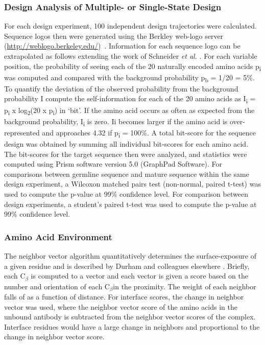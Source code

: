 \subsubsection{Design Analysis of Multiple- or Single-State Design}
For each design experiment, 100 independent design trajectories were calculated. Sequence logos then were generated using the Berkley web-logo server (\url{http://weblogo.berkeley.edu/})~\citep{Crooks:2004do}. Information for each sequence logo can be extrapolated as follows extending the work of Schneider \textit{et al.} \citep{Schneider:1990ub}. For each variable position, the probability of seeing each of the 20 naturally encoded amino acids p\textsubscript{i} was computed and compared with the background probability p\textsubscript{b} = 1/20 = 5\%. To quantify the deviation of the observed probability from the background probability I compute the self-information for each of the 20 amino acids as I\textsubscript{i} = p\textsubscript{i} x log\textsubscript{2}(20 x p\textsubscript{i}) in `bit'. If the amino acid occurs as often as expected from the background probability, I\textsubscript{i} is zero. Ii becomes larger if the amino acid is over-represented and approaches 4.32 if p\textsubscript{i} = 100\%. A total bit-score for the sequence design was obtained by summing all individual bit-scores for each amino acid. The bit-scores for the target sequence then were analyzed, and statistics were computed using Prism software version 5.0 (GraphPad Software).  For comparisons between germline sequence and mature sequence within the same design experiment, a Wilcoxon matched pairs test (non-normal, paired t-test) was used to compute the p-value at 99\% confidence level. For comparison between design experiments, a student's paired t-test was used to compute the p-value at 99\% confidence level.

\subsubsection{Amino Acid Environment}
The neighbor vector algorithm quantitatively determines the surface-exposure of a given residue and is described by Durham and colleagues elsewhere \citep{Durham:2009kt}. Briefly, each C$_{\beta}$ is computed to a vector and each vector is given a score based on the number and orientation of each C$_{\beta}$in the proximity. The weight of each neighbor falls of as a function of distance.
For interface scores, the change in neighbor vector was used, where the neighbor vector score of the amino acids in the unbound antibody is subtracted from the neighbor vector scores of the complex. Interface residues would have a large change in neighbors and proportional to the change in neighbor vector score.

